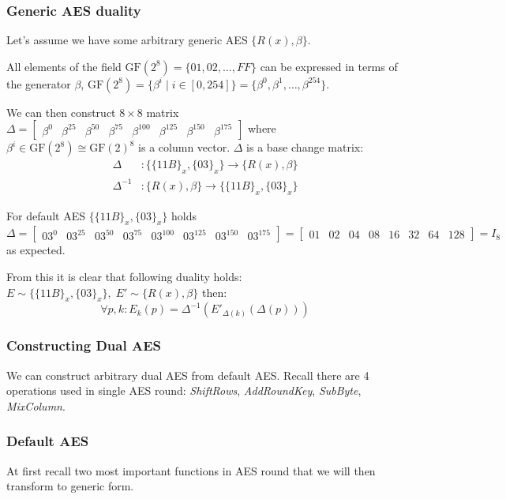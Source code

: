 \documentclass[11pt,oneside,final]{fithesis2}
\begin{document}
	\subsubsection*{Generic AES duality}
	Let's assume we have some arbitrary generic AES $\{R(x), \beta \}$. 

	All elements of the field $\text{GF}(2^8) = \{01, 02, \dots, FF\}$
	can be expressed in terms of the generator $\beta$, $\text{GF}(2^8) = \{\beta^i \; | \; i \in [0,254]\} = \{\beta^0, \beta^1, \dots, \beta^{254}\}$.

	We can then construct $8 \times 8$ matrix $\Delta = \begin{bmatrix} \beta^0 & \beta^{25} & \beta^{50} & \beta^{75} & \beta^{100} & \beta^{125} & \beta^{150} & \beta^{175}  \end{bmatrix}$ where 
	$\beta^i \in \text{GF}(2^8) \cong \text{GF}(2)^8$ is a column vector.  $\Delta$ is a base change matrix:
	\begin{align}
	    \Delta &: \{\{11B\}_x, \{03\}_x\}  \longrightarrow \{R(x), \beta \} \\
	    \Delta^{-1} &: \{R(x), \beta \}  \longrightarrow \{\{11B\}_x, \{03\}_x\}
	\end{align}

	For default AES $\{\{11B\}_x, \{03\}_x\}$ holds $\Delta = \begin{bmatrix} 03^0 & 03^{25} & 03^{50} & 03^{75} & 03^{100} & 03^{125} & 03^{150} & 03^{175}  \end{bmatrix} = \begin{bmatrix} 01 & 02 & 04 & 08 & 16 & 32 & 64 & 128 \end{bmatrix} = I_8$ as expected.

	From this it is clear that following duality holds: $E \sim \{\{11B\}_x, \{03\}_x\}, \; E' \sim \{R(x), \beta \}$ then:
	\begin{equation} 
	\forall p, k: E_k(p) = \Delta^{-1}\left(E'_{\Delta(k)}(\Delta(p))\right)
	\end{equation}

	\subsubsection*{Constructing Dual AES}
	We can construct arbitrary dual AES from default AES. Recall there are 4 operations used in single AES round: \emph{ShiftRows}, \emph{AddRoundKey}, \emph{SubByte}, \emph{MixColumn}.

	\subsubsection*{Default AES}
	At first recall two most important functions in AES round that we will then transform to generic form.
\end{document}
